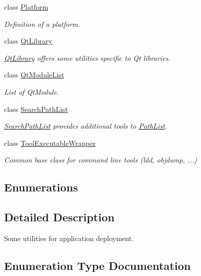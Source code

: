 \begin{DoxyCompactItemize}
class \hyperlink{class_mdt_1_1_deploy_utils_1_1_platform}{Platform}
\begin{DoxyCompactList}\small\item\em Definition of a platform. \end{DoxyCompactList}\item 
class \hyperlink{class_mdt_1_1_deploy_utils_1_1_qt_library}{Qt\+Library}
\begin{DoxyCompactList}\small\item\em \hyperlink{class_mdt_1_1_deploy_utils_1_1_qt_library}{Qt\+Library} offers some utilities specific to Qt libraries. \end{DoxyCompactList}\item 
class \hyperlink{class_mdt_1_1_deploy_utils_1_1_qt_module_list}{Qt\+Module\+List}
\begin{DoxyCompactList}\small\item\em List of Qt\+Module. \end{DoxyCompactList}\item 
class \hyperlink{class_mdt_1_1_deploy_utils_1_1_search_path_list}{Search\+Path\+List}
\begin{DoxyCompactList}\small\item\em \hyperlink{class_mdt_1_1_deploy_utils_1_1_search_path_list}{Search\+Path\+List} provides additional tools to \hyperlink{class_mdt_1_1_deploy_utils_1_1_path_list}{Path\+List}. \end{DoxyCompactList}\item 
class \hyperlink{class_mdt_1_1_deploy_utils_1_1_tool_executable_wrapper}{Tool\+Executable\+Wrapper}
\begin{DoxyCompactList}\small\item\em Common base class for command line tools (ldd, objdump, ...) \end{DoxyCompactList}\end{DoxyCompactItemize}
\subsection*{Enumerations}


\subsection{Detailed Description}
Some utilities for application deployment. 

\subsection{Enumeration Type Documentation}
